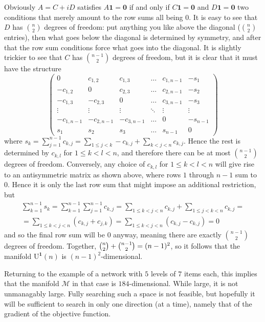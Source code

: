 \documentclass{article}
\newcommand{\mc}{\mathcal}
\newcommand{\vek}{\mathbf}
\newcommand{\UOne}{\mathrm{U}^{\vek{1}}}
\theoremstyle{definition}
\providecommand*{\Dash}{%
   \nobreak\hspace{0.166667em}\textemdash\hspace{0.166667em}%
}
\begin{document}
Obviously \(A = C + iD\) satisfies \(A \vek{1} = \vek{0}\) if and 
only if \(C \vek{1} = \vek{0}\) and \(D \vek{1} = \vek{0}\)\Dash two 
conditions that merely amount to the row sums all being $0$. It is 
easy to see that $D$ has $\binom{n}{2}$ degrees of freedom: put 
anything you like above the diagonal ($\binom{n}{2}$ entries), then 
what goes below the diagonal is determined by symmetry, and after 
that the row sum conditions force what goes into the diagonal. It is 
slightly trickier to see that $C$ has $\binom{n-1}{2}$ degrees of 
freedom, but it is clear that it must have the structure
\begin{equation*}
  \begin{pmatrix}
    0& c_{1,2} & c_{1,3}& \ldots& c_{1,n-1}& -s_1\\
    -c_{1,2}& 0& c_{2,3}& \ldots& c_{2,n-1}& -s_2\\
    -c_{1,3}& -c_{2,3}& 0& \ldots& c_{3,n-1}& -s_3\\
    \vdots& \vdots& \vdots& \ddots& \vdots& \vdots\\
    -c_{1,n-1}& -c_{2,n-1}& -c_{3,n-1}& \ldots& 0& -s_{n-1} \\
    s_1& s_2& s_3& \ldots& s_{n-1}& 0
  \end{pmatrix}
\end{equation*}
where \(s_k = \sum_{j=1}^{n-1} c_{k,j} = \sum_{1 \leqslant j < k} 
-c_{k,j} + \sum_{k < j < n} c_{k,j}\). Hence the rest is 
determined by $c_{k,l}$ for \(1 \leqslant k < l < n\), and therefore 
there can be at most $\binom{n-1}{2}$ degrees of freedom. Conversely, 
any choice of $c_{k,l}$ for \(1 \leqslant k < l < n\) will give rise 
to an antisymmetric matrix as shown above, where rows $1$ through 
$n-1$ sum to $0$. Hence it is only the last row sum that might impose 
an additional restriction, but
\begin{multline*}
  \sum_{k=1}^{n-1} s_k = 
  \sum_{k=1}^{n-1} \sum_{j=1}^{n-1} c_{k,j} =
  \sum_{1 \leqslant k < j < n} c_{k,j} + 
    \sum_{1 \leqslant j < k < n} c_{k,j} = \\ =
  \sum_{1 \leqslant k < j < n} ( c_{k,j} + c_{j,k} ) =
  \sum_{1 \leqslant k < j < n} ( c_{k,j} - c_{k,j} ) =
  0
\end{multline*}
and so the final row sum will be $0$ anyway, meaning there are 
exactly $\binom{n-1}{2}$ degrees of freedom. Together, \(\binom{n}{2} 
+ \binom{n-1}{2} = (n -\nobreak 1)^2\), so it follows that the 
manifold $\UOne(n)$ is $(n {-} 1)^2$-dimensional.

Returning to the example of a network with $5$ levels of $7$ items 
each, this implies that the manifold $\mc{M}$ in that case is 
$184$-dimensional. While large, it is not unmanagably large. 
Fully searching such a space is not feasible, but hopefully it will 
be sufficient to search in only one direction (at a time), namely 
that of the gradient of the objective function.
\end{document}
